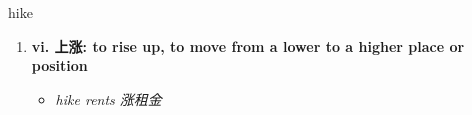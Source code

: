 
\begin{frame}
{\huge hike}
\begin{center}
\begin{enumerate}\Large
  \item \textbf{vi. 上涨: to rise up, to move from a lower to a higher place or position}
  \begin{itemize}
    \item \em{\Large{hike rents 涨租金}}
  \end{itemize}
\end{enumerate}
\end{center}
\end{frame}
